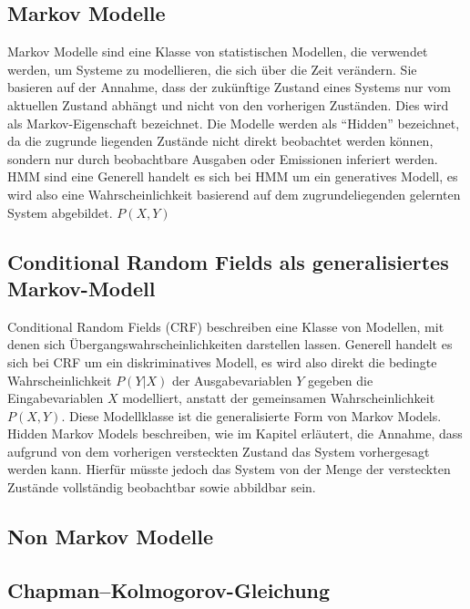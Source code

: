 \subsection{Markov Modelle}

Markov Modelle sind eine Klasse von statistischen Modellen, die verwendet werden, um Systeme zu modellieren, die sich über die Zeit verändern. Sie basieren auf der Annahme, dass der zukünftige Zustand eines Systems nur vom aktuellen Zustand abhängt und nicht von den vorherigen Zuständen. Dies wird als Markov-Eigenschaft bezeichnet.
Die Modelle werden als \enquote{Hidden} bezeichnet, da die zugrunde liegenden Zustände nicht direkt beobachtet werden können, sondern nur durch beobachtbare Ausgaben oder Emissionen inferiert werden.
\newline
HMM sind eine 
Generell handelt es sich bei HMM um ein generatives Modell, es wird also eine Wahrscheinlichkeit basierend auf dem zugrundeliegenden gelernten System abgebildet.
$P(X, Y)$


\subsection{Conditional Random Fields als generalisiertes Markov-Modell}

Conditional Random Fields (CRF) beschreiben eine Klasse von Modellen, mit denen sich Übergangswahrscheinlichkeiten darstellen lassen. Generell handelt es sich bei CRF um ein diskriminatives Modell, es wird also direkt die bedingte Wahrscheinlichkeit $P(Y|X)$ der Ausgabevariablen $Y$ gegeben die Eingabevariablen $X$ modelliert, anstatt der gemeinsamen Wahrscheinlichkeit $P(X, Y)$.
Diese Modellklasse ist die generalisierte Form von Markov Models. Hidden Markov Models beschreiben, wie im Kapitel erläutert, die Annahme, dass aufgrund von dem vorherigen versteckten Zustand das System vorhergesagt werden kann. Hierfür müsste jedoch das System von der Menge der versteckten Zustände vollständig beobachtbar sowie abbildbar sein.

\subsection{Non Markov Modelle}



\subsection{Chapman--Kolmogorov-Gleichung}

